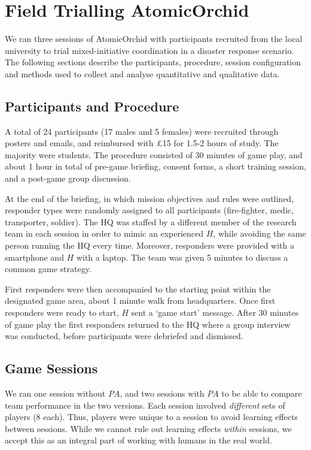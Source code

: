 \section{Field Trialling AtomicOrchid}\label{sec:evaluation}
\noindent We ran three sessions of AtomicOrchid with participants recruited from the local university to trial mixed-initiative coordination in a disaster response scenario. The following sections describe the participants, procedure, session configuration and methods used to collect and analyse quantitative and qualitative data.

\subsection{Participants and Procedure}
\noindent  A total of 24 participants (17 males and 5 females) were recruited through posters and emails, and reimbursed with \pounds 15  for 1.5-2 hours of study. The majority were students. The procedure consisted of 30 minutes of game play, and about 1 hour in total of pre-game briefing, consent forms,  a short training session, and a post-game group discussion. 


At the end of the briefing, in which mission objectives and rules were outlined, responder types were randomly assigned to all participants (fire-fighter, medic, transporter, soldier). The HQ was staffed by a different member of the research team in each session in order to mimic an experienced $H$, while avoiding the same person running the HQ every time.  Moreover, responders were provided with a smartphone and $H$ with a laptop. The team was given 5 minutes to discuss a common game strategy. 

First responders were then accompanied to the starting point within the designated game area, about 1 minute walk from headquarters. Once first responders were ready to start, $H$ sent a `game start' message. After 30 minutes of game play the first responders returned to the HQ where a group interview was conducted, before participants were debriefed and dismissed.

\subsection{Game Sessions}
\noindent We ran one session without $PA$, and two sessions with $PA$ to be able to compare team performance in the two versions. Each session involved \emph{different} sets of players (8 each). Thus,  players were unique to a session to avoid learning effects between sessions. While we cannot rule out learning effects \textit{within} sessions, we accept this as an integral part of working with humans in the real world. 

